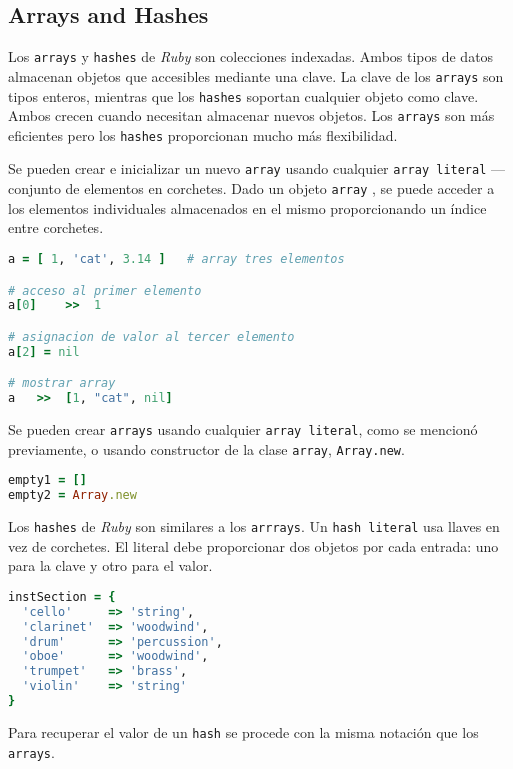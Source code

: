 \subsection{Arrays and Hashes}
Los \texttt{arrays} y \texttt{hashes} de \textit{Ruby} son colecciones indexadas. Ambos tipos de datos almacenan objetos que accesibles mediante una clave. La clave de los  \texttt{arrays} son tipos enteros, mientras que los \texttt{hashes} soportan cualquier objeto como clave. Ambos crecen cuando necesitan almacenar nuevos objetos. Los \texttt{arrays} son más eficientes pero los \texttt{hashes} proporcionan mucho más flexibilidad.

Se pueden crear e inicializar un nuevo \texttt{array} usando cualquier \texttt{array literal} --- conjunto de elementos en corchetes. Dado un objeto \texttt{array} , se puede acceder a los elementos individuales almacenados en el mismo proporcionando un índice entre corchetes.

\begin{lstlisting}[language=Ruby]
a = [ 1, 'cat', 3.14 ]   # array tres elementos

# acceso al primer elemento
a[0]	>>	1

# asignacion de valor al tercer elemento 
a[2] = nil

# mostrar array
a	>>	[1, "cat", nil]
\end{lstlisting}

Se pueden crear \texttt{arrays} usando cualquier \texttt{array literal}, como se mencionó previamente, o usando constructor de la clase \texttt{array}, \texttt{Array.new}.

\begin{lstlisting}[language=Ruby]
empty1 = []
empty2 = Array.new
\end{lstlisting}

Los \texttt{hashes} de \textit{Ruby} son similares a los \texttt{arrrays}. Un \texttt{hash literal} usa llaves en vez de corchetes. El literal debe proporcionar dos objetos por cada entrada: uno para la clave y otro para el valor.

\begin{lstlisting}[language=Ruby]
instSection = {
  'cello'     => 'string',
  'clarinet'  => 'woodwind',
  'drum'      => 'percussion',
  'oboe'      => 'woodwind',
  'trumpet'   => 'brass',
  'violin'    => 'string'
}
\end{lstlisting}

Para recuperar el valor de un \texttt{hash} se procede con la misma notación que los \texttt{arrays}.

